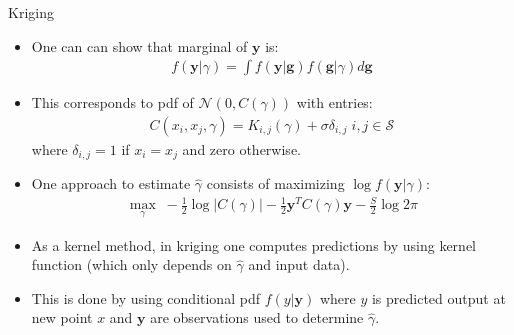 \documentclass[9pt]{beamer}
\begin{document}
\begin{frame}{Kriging}

\begin{itemize}
 
\item One can can show that marginal of $\mathbf{y}$ is:
\begin{align*}
f(\mathbf{y}|\gamma)=\int f(\mathbf{y}|\mathbf{g})f(\mathbf{g}|\gamma)d\mathbf{g}
\end{align*}
\item This corresponds to pdf of $\mathcal{N}(0,C(\gamma))$ with entries:
\begin{align*}
C(x_i,x_j,\gamma)=K_{i,j}(\gamma)+\sigma \delta_{i,j}\; i,j\in \mathcal{S}
\end{align*}
where $\delta_{i,j}=1$ if $x_i=x_j$ and zero otherwise. 

\item One approach to estimate $\hat{\gamma}$ consists of maximizing $\log f(\mathbf{y}|\gamma)$:
\begin{align*}
\max_\gamma \; -\frac{1}{2}\log|C(\gamma)|-\frac{1}{2}\mathbf{y}^TC(\gamma)\mathbf{y}-\frac{S}{2}\log 2\pi
\end{align*}

\item As a kernel method, in kriging one computes predictions by using kernel function (which only depends on $\hat{\gamma}$ and input data).

\item This is done by using conditional pdf $f(y|\mathbf{y})$  where $y$ is predicted output at new point $x$ and $\mathbf{y}$ are observations used to determine $\hat{\gamma}$.

\end{itemize}


\end{frame}

\end{document}
